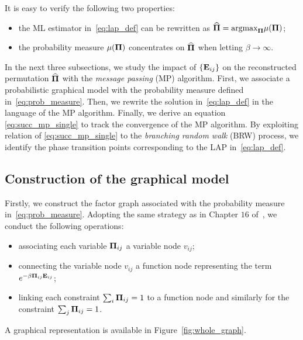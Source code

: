 \documentclass[11pt]{article}
\begin{document}
\newpage


It is easy to  verify the following two properties:
\begin{itemize}[leftmargin=*]
\item the
ML estimator in~\eqref{eq:lap_def} can be
rewritten as $\widehat{\boldsymbol{\Pi}} = \textup{argmax}_{\boldsymbol{\Pi}} \mu(\boldsymbol{\Pi})$;
\item
the probability measure
$\mu(\boldsymbol{\Pi})$ concentrates on
$\widehat{\boldsymbol{\Pi}}$
when letting $\beta\rightarrow \infty$. 	
\end{itemize}

In the next three subsections, we  study the impact of $\{\mathbf{E}_{ij}\}$ on the
reconstructed permutation $\widehat{\boldsymbol{\Pi}}$ with the
\emph{message passing} (MP) algorithm. First, we associate a probabilistic graphical model with the probability measure defined in~\eqref{eq:prob_measure}. Then, we rewrite the solution in~\eqref{eq:lap_def} in the language of the MP algorithm. Finally, we derive an equation \eqref{eq:succ_mp_single} to track the convergence of the MP algorithm. By exploiting relation of \eqref{eq:succ_mp_single} to the \emph{branching random walk} (BRW) process, we identify the phase transition points corresponding to the LAP in~\eqref{eq:lap_def}.

\vspace{0.1in}
\subsection{Construction of the graphical model}
\vspace{0.1in}

Firstly, we construct the factor graph
associated with the probability measure in~\eqref{eq:prob_measure}.
Adopting the same strategy as in
Chapter $16$ of~\citet{mezard2009information}, we conduct the following operations:
\begin{itemize}[leftmargin=*]
\item associating
each variable $\boldsymbol{\Pi}_{ij}$ a variable node $v_{ij}$;
\item connecting the variable node $v_{ij}$ a function node
representing the term $e^{-\beta \boldsymbol{\Pi}_{ij}\mathbf{E}_{ij}}$;
\item linking each constraint
$\sum_i\boldsymbol{\Pi}_{ij} = 1$ to a function node
and similarly for the constraint $\sum_j\boldsymbol{\Pi}_{ij} = 1$.
\end{itemize}
A graphical representation is available in Figure~\ref{fig:whole_graph}.
\end{document}
